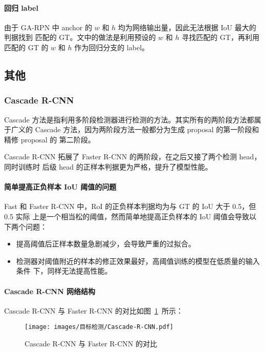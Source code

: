 \paragraph{回归 label}
由于 GA-RPN 中 anchor 的 $w$ 和 $h$ 均为网络输出量，因此无法根据 IoU 最大的判据找到
匹配的 GT。文中的做法是利用预设的 $w$ 和 $h$ 寻找匹配的 GT，再利用匹配的 GT 的 $w$ 和
$h$ 作为回归分支的 label。

\subsection{其他}

\subsubsection{Cascade R-CNN}
\label{subsub:cascade-rcnn}

Cascade 方法是指利用多阶段检测器进行检测的方法。其实所有的两阶段方法都属于广义的
Cascade 方法，因为两阶段方法一般都分为生成 proposal 的第一阶段和精修 proposal 的
第二阶段。

Cascade R-CNN 拓展了 Faster R-CNN 的两阶段，在之后又接了两个检测 head，同时训练时
后级 head 的正样本判据更为严格，提升了模型性能。

\paragraph{简单提高正负样本 IoU 阈值的问题}
Fast 和 Faster R-CNN 中，RoI 的正负样本判据均为与 GT 的 IoU 大于 0.5，但 0.5 实际
上是一个相当松的阈值，然而简单地提高正负样本的 IoU 阈值会导致以下两个问题：

\begin{itemize}
  \item 提高阈值后正样本数量急剧减少，会导致严重的过拟合。
  \item 检测器对阈值附近的样本的修正效果最好，高阈值训练的模型在低质量的输入条件
    下，同样无法提高性能。
\end{itemize}

\paragraph{Cascade R-CNN 网络结构}
Cascade R-CNN 与 Faster R-CNN 的对比如图~\ref{fig:Cascade-RCNN}~所示：

\begin{figure}[ht]
  \centering
  \texttt{[image: images/目标检测/Cascade-R-CNN.pdf]}
  \caption{Cascade R-CNN 与 Faster R-CNN 的对比}
  \label{fig:Cascade-RCNN}
\end{figure}

